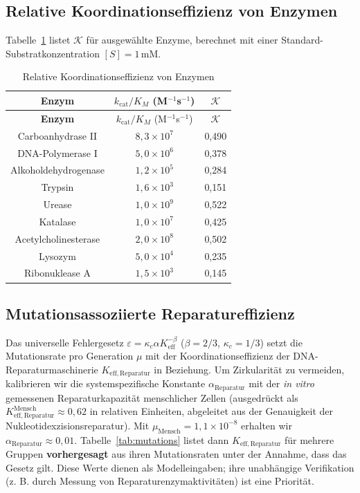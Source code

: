 \documentclass[12pt,a4paper]{article}
\newcommand{\REL}{\mathcal{K}}          %
\begin{document}
	\subsection{Relative Koordinationseffizienz von Enzymen}
	\label{sec:enzymes}
	Tabelle~\ref{tab:enzymes} listet \(\REL\) für ausgewählte Enzyme, berechnet mit einer Standard-Substratkonzentration \([S]=1\,\text{mM}\).
	
	\begin{longtable}{|c|c|c|}
		\caption{Relative Koordinationseffizienz von Enzymen}\label{tab:enzymes}\\
		\hline
		\textbf{Enzym} & \(k_{\mathrm{cat}}/K_M\) (M\(^{-1}\)s\(^{-1}\)) & \(\REL\) \\
		\hline
		\endfirsthead
		\hline
		\textbf{Enzym} & \(k_{\mathrm{cat}}/K_M\) (M\(^{-1}\)s\(^{-1}\)) & \(\REL\) \\
		\hline
		\endhead
		\hline
		Carboanhydrase II & \(8,3\times10^7\) & 0,490 \\
		DNA-Polymerase I & \(5,0\times10^6\) & 0,378 \\
		Alkoholdehydrogenase & \(1,2\times10^5\) & 0,284 \\
		Trypsin & \(1,6\times10^3\) & 0,151 \\
		Urease & \(1,0\times10^9\) & 0,522 \\
		Katalase & \(1,0\times10^7\) & 0,425 \\
		Acetylcholinesterase & \(2,0\times10^8\) & 0,502 \\
		Lysozym & \(5,0\times10^4\) & 0,235 \\
		Ribonuklease A & \(1,5\times10^3\) & 0,145 \\
		\hline
	\end{longtable}
	
	\subsection{Mutationsassoziierte Reparatureffizienz}
	\label{sec:mutations}
	Das universelle Fehlergesetz \(\varepsilon = \kappa_c \alpha K_{\mathrm{eff}}^{-\beta}\) (\(\beta=2/3\), \(\kappa_c=1/3\)) setzt die Mutationsrate pro Generation \(\mu\) mit der Koordinationseffizienz der DNA-Reparaturmaschinerie \(K_{\mathrm{eff,Reparatur}}\) in Beziehung. Um Zirkularität zu vermeiden, kalibrieren wir die systemspezifische Konstante \(\alpha_{\mathrm{Reparatur}}\) mit der \textit{in vitro} gemessenen Reparaturkapazität menschlicher Zellen (ausgedrückt als \(K_{\mathrm{eff,Reparatur}}^{\mathrm{Mensch}} \approx 0,62\) in relativen Einheiten, abgeleitet aus der Genauigkeit der Nukleotidexzisionsreparatur). Mit \(\mu_{\mathrm{Mensch}}=1,1\times10^{-8}\) erhalten wir \(\alpha_{\mathrm{Reparatur}} \approx 0,01\). Tabelle~\ref{tab:mutations} listet dann \(K_{\mathrm{eff,Reparatur}}\) für mehrere Gruppen \textbf{vorhergesagt} aus ihren Mutationsraten unter der Annahme, dass das Gesetz gilt. Diese Werte dienen als Modelleingaben; ihre unabhängige Verifikation (z. B. durch Messung von Reparaturenzymaktivitäten) ist eine Priorität.
	
\end{document}
